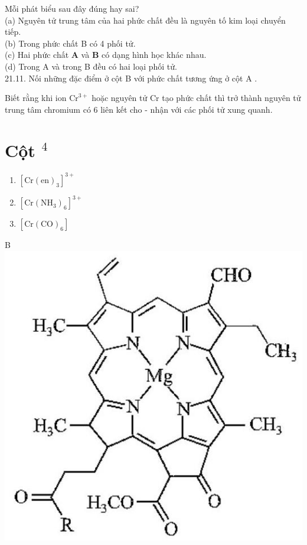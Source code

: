 \documentclass[10pt]{article}
\begin{document}
Mỗi phát biểu sau đây đúng hay sai?\\
(a) Nguyên tử trung tâm của hai phức chất đều là nguyên tố kim loại chuyển tiếp.\\
(b) Trong phức chất B có 4 phối tử.\\
(c) Hai phức chất $\mathbf{A}$ và $\mathbf{B}$ có dạng hình học khác nhau.\\
(d) Trong A và trong B đều có hai loại phối tử.\\
21.11. Nối những đặc điểm ở cột B với phức chất tương ứng ở cột A .

Biết rằng khi ion $\mathrm{Cr}^{3+}$ hoặc nguyên tử Cr tạo phức chất thì trở thành nguyên tử trung tâm chromium có 6 liên kết cho - nhận với các phối tử xung quanh.

\section*{Cột ${ }^{4}$}
\begin{enumerate}
  \item $\left[\mathrm{Cr}(\mathrm{en})_{3}\right]^{3+}$
  \item $\left[\mathrm{Cr}\left(\mathrm{NH}_{3}\right)_{6}\right]^{3+}$
  \item $\left[\mathrm{Cr}(\mathrm{CO})_{6}\right]$
\end{enumerate}

B\\
\includegraphics[max width=\textwidth, center]{2025_10_23_80c1361fcdcd395cad8eg-69}
\end{document}
